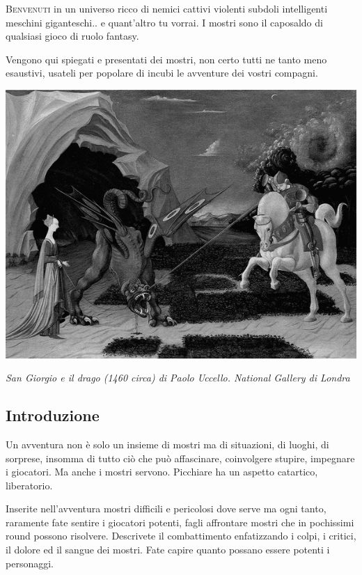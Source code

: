 \begin{multicols}{2}

	\lettrine[lines=2, lhang=0.33, loversize=0.25, findent=1.5em]{B}{envenuti} in un universo ricco di nemici cattivi violenti subdoli intelligenti meschini giganteschi.. e quant'altro tu vorrai. I mostri sono il caposaldo di qualsiasi gioco di ruolo fantasy.

	Vengono qui spiegati e presentati dei mostri, non certo tutti ne tanto meno esaustivi, usateli per popolare di incubi le avventure dei vostri compagni.

	\medskip

	\begin{center}

		\includegraphics[width=0.8\linewidth]{immagini/sangiorgioedrago.png}

		\textit{San Giorgio e il drago (1460 circa) di Paolo Uccello. National Gallery di Londra}
	\end{center}

	\subsection{Introduzione}

	Un avventura non è solo un insieme di mostri ma di situazioni, di luoghi, di sorprese, insomma di tutto ciò che può affascinare, coinvolgere stupire, impegnare i giocatori. Ma anche i mostri servono. Picchiare ha un aspetto catartico, liberatorio.

	Inserite nell'avventura mostri difficili e pericolosi dove serve ma ogni tanto, raramente fate sentire i giocatori potenti, fagli affrontare mostri che in pochissimi round possono risolvere. Descrivete il combattimento enfatizzando i colpi, i critici, il dolore ed il sangue dei mostri. Fate capire quanto possano essere potenti i personaggi.


\end{multicols}
